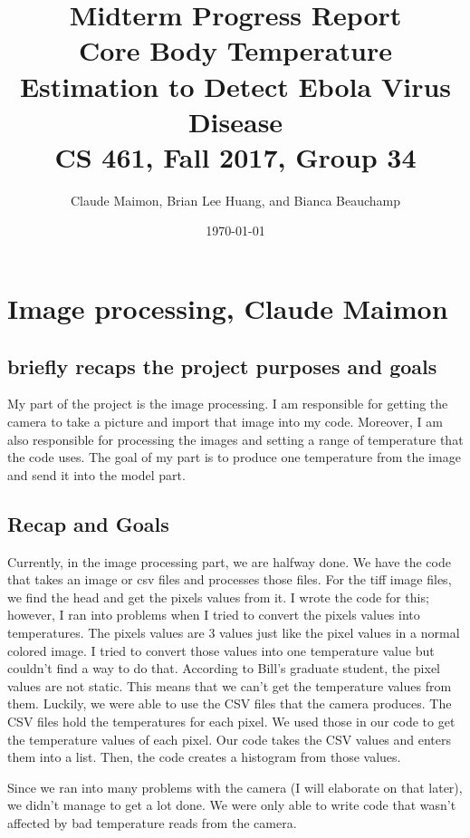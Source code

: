 \documentclass[onecolumn, draftclsnofoot,10pt, compsoc]{IEEEtran}
\title{%
  Midterm Progress Report \\
  \vspace{0.4cm}
  \large Core Body Temperature Estimation to Detect Ebola Virus Disease \\
  \vspace{0.4cm}
  \large CS 461, Fall 2017, Group 34\\
    }
\author{Claude Maimon, Brian Lee Huang, and Bianca Beauchamp}
\date{\today}
\begin{document}
\maketitle

\begin{abstract}

\end{abstract}

\newpage

\tableofcontents
\newpage


\section{Image processing, Claude Maimon}

\subsection{briefly recaps the project purposes and goals}
My part of the project is the image processing. I am responsible for getting the camera to take a picture and import that image into my code. Moreover, I am also responsible for processing the images and setting a range of temperature that the code uses. The goal of my part is to produce one temperature from the image and send it into the model part. 


\subsection{Recap and Goals}
Currently, in the image processing part, we are halfway done. We have the code that takes an image or csv files and processes those files. For the tiff image files, we find the head and get the pixels values from it. I wrote the code for this; however, I ran into problems when I tried to convert the pixels values into temperatures. The pixels values are 3 values just like the pixel values in a normal colored image. I tried to convert those values into one temperature value but couldn’t find a way to do that. According to Bill’s graduate student, the pixel values are not static. This means that we can’t get the temperature values from them. Luckily, we were able to use the CSV files that the camera produces. The CSV files hold the temperatures for each pixel. We used those in our code to get the temperature values of each pixel.  Our code takes the CSV values and enters them into a list. Then, the code creates a histogram from those values. 


Since we ran into many problems with the camera (I will elaborate on that later), we didn’t manage to get a lot done. We were only able to write code that wasn’t affected by bad temperature reads from the camera. 
\end{document}
